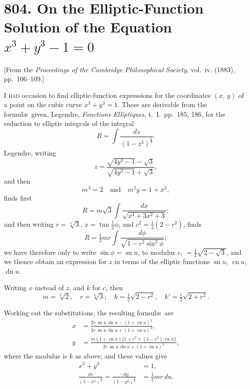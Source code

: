 \documentclass[11pt,a4paper]{article}
\theoremstyle{plain}
\theoremstyle{definition}
\theoremstyle{remark}
\begin{document}
\newpage
\section*{804. On the Elliptic-Function Solution of the Equation $x^3 + y^3 - 1 = 0$}

\begin{center}
\small[From the \textit{Proceedings of the Cambridge Philosophical Society}, vol.~iv. (1883),\\
pp.~106--109.]
\end{center}

\bigskip

\noindent
\textsc{I had} occasion to find elliptic-function expressions for the coordinates $(x,\,y)$ of a point on the cubic curve $x^3 + y^3 = 1$. These are derivable from the formul\ae\ given, Legendre, \textit{Fonctions Elliptiques}, t.~I.\ pp.~185, 186, for the reduction to elliptic integrals of the integral
\[
R = \int \frac{dz}{(1-z^3)^{\frac{2}{3}}}.
\]
Legendre, writing
\[
z = \frac{\sqrt{4y^3-1} - \sqrt{3}}{\sqrt{4y^3-1} + \sqrt{3}},
\]
and then
\[
m^3 = 2 \quad\text{and}\quad m^2 y = 1 + x^2,
\]
finds first
\[
R = m\sqrt{3}\int \frac{dx}{\sqrt{x^4 + 3x^2 + 3}};
\]
and then writing $r = \sqrt[4]{3}$, $x = \tan\frac{1}{2}\phi$, and $c^2 = \frac{1}{4}(2-r^2)$, finds
\[
R = \tfrac{1}{2}mr \int \frac{d\phi}{\sqrt{1-c^2 \sin^2 \phi}};
\]
we have therefore only to write $\sin\phi = \operatorname{sn} u$, to modulus $c$, $= \frac{1}{2}\sqrt{2-\sqrt{3}}$, and we thence obtain an expression for $z$ in terms of the elliptic functions $\operatorname{sn} u$, $\operatorname{cn} u$, $\operatorname{dn} u$.

Writing $x$ instead of $z$, and $k$ for $c$, then
\[
m = \sqrt[3]{2},\quad r = \sqrt[4]{3};\quad k = \tfrac{1}{2}\sqrt{2-r^2},\quad k' = \tfrac{1}{2}\sqrt{2+r^2}.
\]

Working out the substitutions, the resulting formul\ae\ are
\begin{align*}
x &= \frac{2r\,\operatorname{sn} u\,\operatorname{dn} u - (1+\operatorname{cn} u)^2}{2r\,\operatorname{sn} u\,\operatorname{dn} u + (1+\operatorname{cn} u)^2},\\[0.5em]
y &= \frac{m(1+\operatorname{cn} u)\{1+r^2 + (1-r^2)\,\operatorname{cn} u\}}{2r\,\operatorname{sn} u\,\operatorname{dn} u + (1+\operatorname{cn} u)^2},
\end{align*}
where the modulus is $k$ as above; and these values give
\begin{align*}
x^3 + y^3 &= 1,\\
\frac{dx}{(1-x^3)^{\frac{2}{3}}} = \frac{-dy}{(1-y^3)^{\frac{2}{3}}} &= \tfrac{1}{2}mr\,du.
\end{align*}
\end{document}

